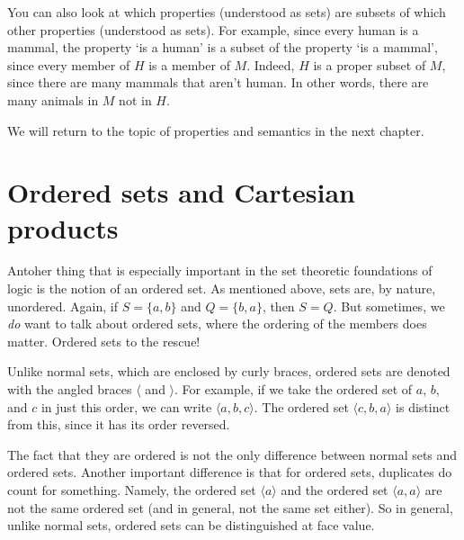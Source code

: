 You can also look at which properties (understood as sets) are subsets of which other properties (understood as sets). For example, since every human is a mammal, the property `is a human' is a subset of the property `is a mammal', since every member of $H$ is a member of $M$. Indeed, $H$ is a proper subset of $M$, since there are many mammals that aren't human. In other words, there are many animals in $M$ not in $H$. 


We will return to the topic of properties and semantics in the next chapter. 

\section{Ordered sets and Cartesian products}

Antoher thing that is especially important in the set theoretic foundations of logic is the notion of an ordered set. As mentioned above, sets are, by nature, unordered. Again, if $S=\{a, b\}$ and $Q=\{b, a\}$, then $S=Q$. But sometimes, we \textit{do} want to talk about ordered sets, where the ordering of the members does matter. Ordered sets to the rescue! 

Unlike normal sets, which are enclosed by curly braces, ordered sets are denoted with the angled braces $\langle$ and $\rangle$. For example, if we take the ordered set of $a$, $b$, and $c$ in just this order, we can write $\langle a, b, c \rangle$. The ordered set $\langle c, b, a \rangle$ is distinct from this, since it has its order reversed. 

The fact that they are ordered is not the only difference between normal sets and ordered sets. Another important difference is that for ordered sets, duplicates do count for something. Namely, the ordered set $\langle a \rangle$ and the ordered set $\langle a, a\rangle$ are not the same ordered set (and in general, not the same set either). So in general, unlike normal sets, ordered sets can be distinguished at face value. 

